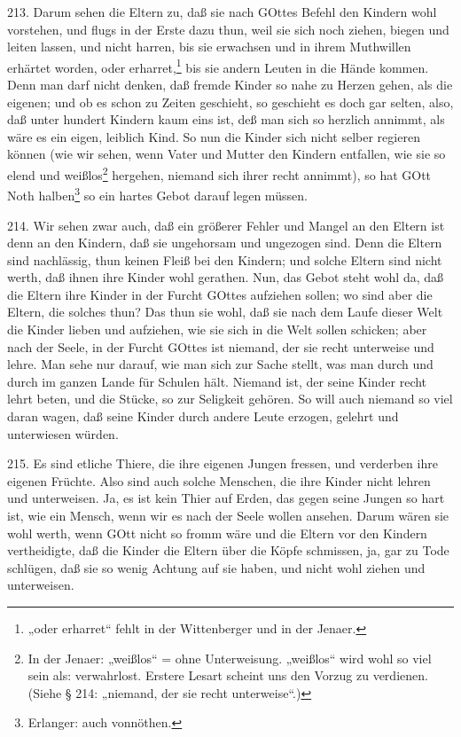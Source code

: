 213. Darum sehen die Eltern zu, daß sie nach GOttes Befehl den Kindern wohl vorstehen, und flugs in der Erste dazu thun, weil sie sich noch ziehen, biegen und leiten lassen, und nicht harren, bis sie erwachsen und in ihrem Muthwillen erhärtet worden, oder erharret,\footnote{„oder erharret“ fehlt in der Wittenberger und in der Jenaer.} bis sie andern Leuten in die Hände kommen. Denn man darf nicht denken, daß fremde Kinder so nahe zu Herzen gehen, als die eigenen; und ob es schon zu Zeiten geschieht, so geschieht es doch gar selten, also, daß unter hundert Kindern kaum eins ist, deß man sich so herzlich annimmt, als wäre es ein eigen, leiblich Kind. So nun die Kinder sich nicht selber regieren können (wie wir sehen, wenn Vater und Mutter den Kindern entfallen, wie sie so elend und weißlos\footnote{In der Jenaer: „weißlos“ = ohne Unterweisung. „weißlos“ wird wohl so viel sein als: verwahrlost. Erstere Lesart scheint uns den Vorzug zu verdienen. (Siehe § 214: „niemand, der sie recht unterweise“.)} hergehen, niemand sich ihrer recht annimmt), so hat GOtt Noth halben\footnote{Erlanger: auch vonnöthen.} so ein hartes Gebot darauf legen müssen.

214. Wir sehen zwar auch, daß ein größerer Fehler und Mangel an den Eltern ist denn an den Kindern, daß sie ungehorsam und ungezogen sind. Denn die Eltern sind nachlässig, thun keinen Fleiß bei den Kindern; und solche Eltern sind nicht werth, daß ihnen ihre Kinder wohl gerathen. Nun, das Gebot steht wohl da, daß die Eltern ihre Kinder in der Furcht GOttes aufziehen sollen; wo sind aber die Eltern, die solches thun? Das thun sie wohl, daß sie nach dem Laufe dieser Welt die Kinder lieben und aufziehen, wie sie sich in die Welt sollen schicken; aber nach der Seele, in der Furcht GOttes ist niemand, der sie recht unterweise und lehre. Man sehe nur darauf, wie man sich zur Sache stellt, was man durch und durch im ganzen Lande für Schulen hält. Niemand ist, der seine Kinder recht lehrt beten, und die Stücke, so zur Seligkeit gehören. So will auch niemand so viel daran wagen, daß seine Kinder durch andere Leute erzogen, gelehrt und unterwiesen würden.

215. Es sind etliche Thiere, die ihre eigenen Jungen fressen, und verderben ihre eigenen Früchte. Also sind auch solche Menschen, die ihre Kinder nicht lehren und unterweisen. Ja, es ist kein Thier auf Erden, das gegen seine Jungen so hart ist, wie ein Mensch, wenn wir es nach der Seele wollen ansehen. Darum wären sie wohl werth, wenn GOtt nicht so fromm wäre und die Eltern vor den Kindern vertheidigte, daß die Kinder die Eltern über die Köpfe schmissen, ja, gar zu Tode schlügen, daß sie so wenig Achtung auf sie haben, und nicht wohl ziehen und unterweisen.

